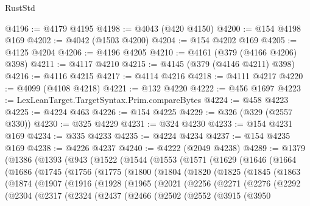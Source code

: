 \begin{lexlean}{RustStd}
\begin{coremodule}
@4196 := @4179 @4195
@4198 := @4043 (@420 @4150)
@4200 := @154 @4198 @169
@4202 := @4042 (@1503 @4200)
@4204 := @154 @4202 @169
@4205 := @4125 @4204
@4206 := @4196 @4205
@4210 := @4161 (@379 (@4166 @4206) @398)
@4211 := @4117 @4210
@4215 := @4145 (@379 (@4146 @4211) @398)
@4216 := @4116 @4215
@4217 := @4114 @4216
@4218 := @4111 @4217
@4220 := @4099 (@4108 @4218)
@4221 := @132 @4220
@4222 := @456 @1697
@4223 := LexLeanTarget.TargetSyntax.Prim.compareBytes
@4224 := @458 @4223
@4225 := @4224 @463
@4226 := @154 @4225
@4229 := @326 (@329 (@2557 @330))
@4230 := @325 @4229
@4231 := @324 @4230
@4233 := @154 @4231 @169
@4234 := @335 @4233
@4235 := @4224 @4234
@4237 := @154 @4235 @169
@4238 := @4226 @4237
@4240 := @4222 (@2049 @4238)
@4289 := @1379
    (@1386
      (@1393
        (@943
          (@1522
            (@1544
              (@1553
                (@1571
                  (@1629
                    (@1646
                      (@1664
                        (@1686
                          (@1745
                            (@1756
                              (@1775
                                (@1800
                                  (@1804
                                    (@1820
                                      (@1825
                                        (@1845
                                          (@1863
                                            (@1874
                                              (@1907
                                                (@1916
                                                  (@1928
                                                    (@1965
                                                      (@2021
                                                        (@2256
                                                          (@2271
                                                            (@2276
                                                              (@2292
                                                                (@2304
                                                                  (@2317
                                                                    (@2324
                                                                      (@2437
                                                                        (@2466
                                                                          (@2502
                                                                            (@2552
                                                                              (@3915
                                                                                (@3950

\end{coremodule}
\end{lexlean}
